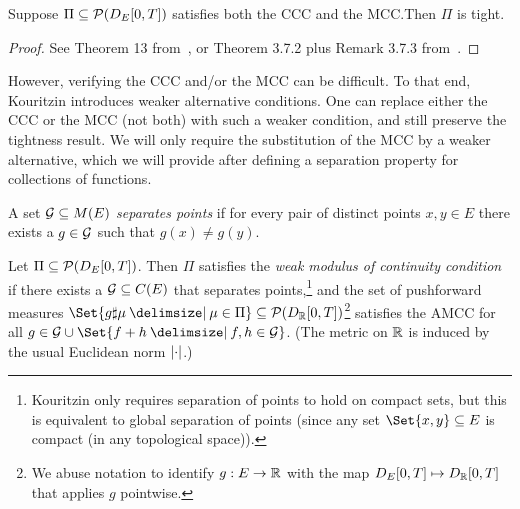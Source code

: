 \begin{theorem}
  Suppose \( \Pi \subseteq \mathcal{P}(D_{E}[0,T]) \) satisfies both the CCC and the MCC.\@ Then \( \Pi \) is tight.
\end{theorem}

\begin{proof}
  See Theorem 13 from~\cite{kouritzinTightnessProbabilityMeasures2015}, or Theorem 3.7.2 plus Remark 3.7.3 from~\cite{ethierMarkovProcessesCharacterization1985}.
\end{proof}

However, verifying the CCC and/or the MCC can be difficult.
To that end, Kouritzin introduces weaker alternative conditions.
One can replace either the CCC or the MCC (not both) with such a weaker condition, and still preserve the tightness result.
We will only require the substitution of the MCC by a weaker alternative, which we will provide after defining a separation property for collections of functions.

\begin{definition}\label{def:s.p.}
  A set \( \mathcal{G} \subseteq M(E) \) \textit{separates points} if for every pair of distinct points \( x, y \in E \) there exists a \( g \in \mathcal{G} \) such that \( g(x) \neq g(y) \).
\end{definition}

\begin{definition}[WMCC]\label{def:WMCC}
  Let \( \Pi \subseteq \mathcal{P}(D_{E}[0,T]) \).
  Then \( \Pi \) satisfies the \textit{weak modulus of continuity condition} if there exists a \( \mathcal{G} \subseteq C(E) \) that separates points,\footnote{Kouritzin only requires separation of points to hold on compact sets, but this is equivalent to global separation of points (since any set \( \Set{x,y} \subseteq E \) is compact (in any topological space)).}
  and the set of pushforward measures \( \Set{g \sharp \mu \given \mu \in \Pi} \subseteq \cP(D_\bR[0,T]) \)\footnote{We abuse notation to identify \( g : E \to \mathbb{R} \) with the map \( D_E[0,T] \mapsto D_{\mathbb{R}}[0,T] \) that applies \( g \) pointwise.} satisfies the AMCC for all \( g \in \cG \cup \Set{f + h \given f, h \in \cG} \).
  (The metric on \( \mathbb{R} \) is induced by the usual Euclidean norm \( \lvert\cdot\rvert \).)
\end{definition}

